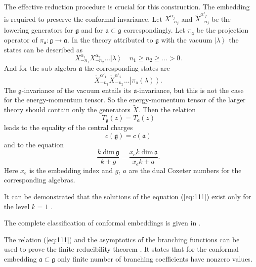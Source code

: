 \documentclass[12pt]{iopart}
\theoremstyle{definition}
\theoremstyle{definition}
\theoremstyle{definition}
\begin{document}
The effective reduction procedure is crucial for this construction.
The embedding is required to preserve the conformal invariance.
Let $X^{\alpha_j}_{-n_j}$ and $\tilde{X}^{\alpha'_j}_{-n_j}$ be the lowering generators for
$\mathfrak{g}$ and for $\mathfrak{a}\subset\mathfrak{g}$ correspondingly.
Let $\pi_{\mathfrak{a}}$ be the projection operator of
$\pi_{\mathfrak{a}}:\mathfrak{g}\longrightarrow \mathfrak{a}$.
In the theory attributed to $\mathfrak{g}$ with the vacuum $\left|\lambda\right>$
the states can be described as
\begin{equation*}
  \label{eq:109}
  X^{\alpha_1}_{-n_1}X^{\alpha_2}_{-n_2}\dots\left|\lambda\right>\quad n_1\geq n_2\geq \dots>0.
\end{equation*}
And for the sub-algebra $\mathfrak{a}$ the corresponding states are
\begin{equation*}
  \label{eq:110}
  \tilde{X}^{\alpha'_1}_{-n_1}\tilde{X}^{\alpha'_2}_{-n_2}\dots\left|\pi_{\mathfrak{a}}(\lambda)\right>.
\end{equation*}
The $\mathfrak{g}$-invariance of the vacuum entails its $\mathfrak{a}$-invariance,
but this is not the case for the energy-momentum tensor. So the energy-momentum tensor of the larger theory
should contain only the generators $\tilde{X}$. Then the relation
\begin{equation}
  \label{eq:2}
  T_{\mathfrak{g}}(z)=T_{\mathfrak{a}}(z)
\end{equation}
leads to the equality of the central charges
\begin{equation*}
  \label{eq:33}
  c(\mathfrak{g})=c(\mathfrak{a})
\end{equation*}
and to the equation
\begin{equation}
  \label{eq:111}
  \frac{k\;\mathrm{dim}\,\mathfrak{g}}{k+g}=\frac{x_e k\; \mathrm{dim}\,\mathfrak{a}}{x_ek+a}.
\end{equation}
Here $x_e$ is the embedding index and $g$, $a$ are the dual Coxeter numbers for the  corresponding algebras.

It can be demonstrated that the solutions of the equation (\ref{eq:111}) exist only
for the level $k=1$ \cite{difrancesco1997cft}.

The complete classification of conformal embeddings is given in \cite{schellekens1986conformal}.

The relation (\ref{eq:111}) and the asymptotics of the branching functions can be used
to prove the finite reducibility theorem \cite{kac1988modular}.
It states that for the conformal embedding  $\mathfrak{a}\subset\mathfrak{g}$
only finite number of branching coefficients have nonzero values.
\end{document}
